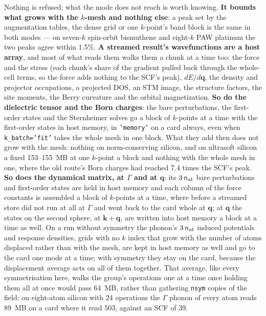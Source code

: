 \documentclass[11pt,a4paper]{article}
\newcommand{\code}[1]{\texttt{\small #1}}
\begin{document}
\begin{refuses}
Nothing is refused; what the mode does not reach is worth knowing. \textbf{It
bounds what grows with the $k$-mesh and nothing else}: a peak set by the
augmentation tables, the dense grid or one $k$-point's band block is the same
in both modes --- on seven-$k$ spin-orbit bismuthene and eight-$k$ PAW platinum
the two peaks agree within 1.5\%. \textbf{A streamed result's wavefunctions are
a host array}, and most of what reads them walks them a chunk at a time too: the
force and the stress (each chunk's share of the gradient pulled back through the
whole-cell terms, so the force adds nothing to the SCF's peak), $dE/d\mathbf q$,
the density and projector occupations, a projected DOS, an STM image, the
structure factors, the site moments, the Berry curvature and the orbital
magnetization. \textbf{So do the dielectric tensor and the Born charges}: the
bare perturbations, the first-order states and the Sternheimer solves go a block
of $k$-points at a time with the first-order states in host memory, in
\code{'memory'} on a card always, even when \code{k\_batch='fit'} takes the
whole mesh in one block. What they add then does not grow with the mesh: nothing
on norm-conserving silicon, and on ultrasoft silicon a fixed 153--155~MB at one
$k$-point a block and nothing with the whole mesh in one, where the old route's
Born charges had reached 7.4 times the SCF's peak. \textbf{So does the
dynamical matrix, at $\Gamma$ and at $\mathbf q$}: its $3\,n_{\rm at}$ bare
perturbations and first-order states are held in host memory and each column of
the force constants is assembled a block of $k$-points at a time, where before a
streamed store did not run at all at $\Gamma$ and went back to the card whole at
$\mathbf q$; at $\mathbf q$ the states on the second sphere, at
$\mathbf k+\mathbf q$, are written into host memory a block at a time as well.
On a run without symmetry the phonon's $3\,n_{\rm at}$ induced potentials and
response densities, grids with no $k$ index that grow with the number of atoms
displaced rather than with the mesh, are kept in host memory as well and go to
the card one mode at a time; with symmetry they stay on the card, because the
displacement average acts on all of them together. That average, like every
symmetrisation here, walks the group's operations one at a time once holding
them all at once would pass 64~MB, rather than gathering \code{nsym} copies of
the field: on eight-atom silicon with 24 operations the $\Gamma$ phonon of every
atom reads 89~MB on a card where it read 503, against an SCF of 39.

\end{refuses}
\end{document}

